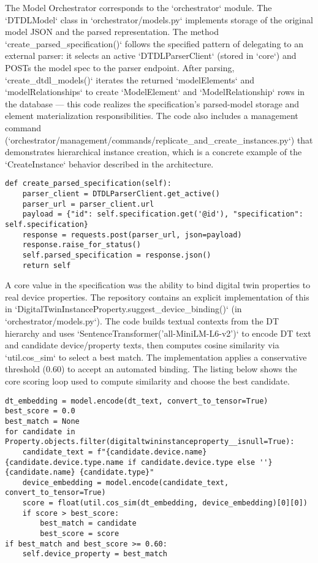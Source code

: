 \documentclass[11pt,a4paper]{article}
\begin{document}
The Model Orchestrator corresponds to the `orchestrator` module. The `DTDLModel` class in `orchestrator/models.py` implements storage of the original model JSON and the parsed representation. The method `create_parsed_specification()` follows the specified pattern of delegating to an external parser: it selects an active `DTDLParserClient` (stored in `core`) and POSTs the model spec to the parser endpoint. After parsing, `create_dtdl_models()` iterates the returned `modelElements` and `modelRelationships` to create `ModelElement` and `ModelRelationship` rows in the database — this code realizes the specification's parsed-model storage and element materialization responsibilities. The code also includes a management command (`orchestrator/management/commands/replicate_and_create_instances.py`) that demonstrates hierarchical instance creation, which is a concrete example of the `CreateInstance` behavior described in the architecture.

\begin{lstlisting}[style=pythonstyle,caption={DTDLModel.create_parsed_specification (orchestrator/models.py) - simplified}]
def create_parsed_specification(self):
	parser_client = DTDLParserClient.get_active()
	parser_url = parser_client.url
	payload = {"id": self.specification.get('@id'), "specification": self.specification}
	response = requests.post(parser_url, json=payload)
	response.raise_for_status()
	self.parsed_specification = response.json()
	return self
\end{lstlisting}

A core value in the specification was the ability to bind digital twin properties to real device properties. The repository contains an explicit implementation of this in `DigitalTwinInstanceProperty.suggest_device_binding()` (in `orchestrator/models.py`). The code builds textual contexts from the DT hierarchy and uses `SentenceTransformer('all-MiniLM-L6-v2')` to encode DT text and candidate device/property texts, then computes cosine similarity via `util.cos_sim` to select a best match. The implementation applies a conservative threshold (0.60) to accept an automated binding. The listing below shows the core scoring loop used to compute similarity and choose the best candidate.

\begin{lstlisting}[style=pythonstyle,caption={Semantic binding loop (orchestrator/models.py) - core scoring loop}]
dt_embedding = model.encode(dt_text, convert_to_tensor=True)
best_score = 0.0
best_match = None
for candidate in Property.objects.filter(digitaltwininstanceproperty__isnull=True):
	candidate_text = f"{candidate.device.name} {candidate.device.type.name if candidate.device.type else ''} {candidate.name} {candidate.type}"
	device_embedding = model.encode(candidate_text, convert_to_tensor=True)
	score = float(util.cos_sim(dt_embedding, device_embedding)[0][0])
	if score > best_score:
		best_match = candidate
		best_score = score
if best_match and best_score >= 0.60:
	self.device_property = best_match
\end{lstlisting}
\end{document}
